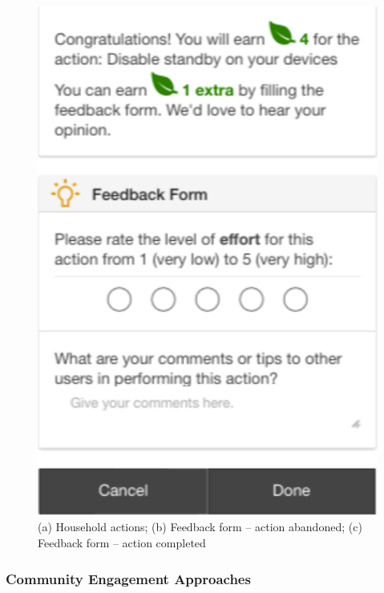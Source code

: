 \begin{figure}
\begin{center}
\begin{minipage}[t!]{0.33\linewidth}
        \end{minipage}
        \begin{minipage}[t!]{0.31\linewidth}
        	       \includegraphics[width=1\linewidth]{img/action_completed.pdf}
                \end{minipage}
      \end{center}
      \caption{(a) Household actions; (b) Feedback form -- action abandoned; (c) Feedback form -- action completed}\label{fig:form}
\end{figure}



\subsubsection{Community Engagement Approaches} %

